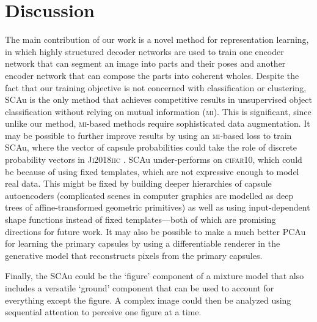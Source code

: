 \section{Discussion}\vspace*{-5pt}
\label{sec:sca_discussion}
    The main contribution of our work is a novel method for representation learning, in which highly structured decoder networks are used to train one encoder network that can segment an image into parts and their poses and another encoder network that can compose the parts into coherent wholes.
    Despite the fact that our training objective is not concerned with classification or clustering,
    \gls{SCAu} is the only method that achieves competitive results in unsupervised object classification without relying on mutual information (\textsc{mi}).
    This is significant, since unlike our method, \textsc{mi}-based methods require sophisticated data augmentation.
    It may be possible to further improve results by using an \textsc{mi}-based loss to train \gls{SCAu}, where the vector of capsule probabilities could take the role of discrete probability vectors in \textsc{Ji2018iic} \citep{Iic}.
    \gls{SCAu} under-performs on \textsc{cifar10}, which could be because of using fixed templates, which are not expressive enough to model real data.
    This might be fixed by building deeper hierarchies of capsule autoencoders (\!\eg complicated scenes in computer graphics are modelled as deep trees of affine-transformed geometric primitives) as well as using input-dependent shape functions instead of fixed templates---both of which are promising directions for future work.
    It may also be possible to make a much better \gls{PCAu} for learning the primary capsules by using a differentiable renderer in the generative model that reconstructs pixels from the primary capsules.
    
    Finally, the \gls{SCAu} could be the `figure' component of a mixture model that also includes a versatile `ground' component  that can be used to account for everything except the figure.  A complex image could then be analyzed using sequential attention to perceive one figure at a time. 